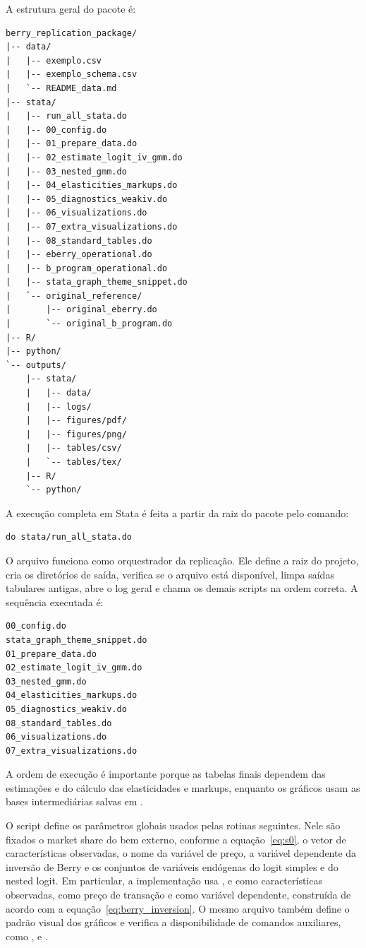 \documentclass[12pt,a4paper]{article}
\begin{document}
A estrutura geral do pacote é:

\begin{verbatim}
berry_replication_package/
|-- data/
|   |-- exemplo.csv
|   |-- exemplo_schema.csv
|   `-- README_data.md
|-- stata/
|   |-- run_all_stata.do
|   |-- 00_config.do
|   |-- 01_prepare_data.do
|   |-- 02_estimate_logit_iv_gmm.do
|   |-- 03_nested_gmm.do
|   |-- 04_elasticities_markups.do
|   |-- 05_diagnostics_weakiv.do
|   |-- 06_visualizations.do
|   |-- 07_extra_visualizations.do
|   |-- 08_standard_tables.do
|   |-- eberry_operational.do
|   |-- b_program_operational.do
|   |-- stata_graph_theme_snippet.do
|   `-- original_reference/
|       |-- original_eberry.do
|       `-- original_b_program.do
|-- R/
|-- python/
`-- outputs/
    |-- stata/
    |   |-- data/
    |   |-- logs/
    |   |-- figures/pdf/
    |   |-- figures/png/
    |   |-- tables/csv/
    |   `-- tables/tex/
    |-- R/
    `-- python/
\end{verbatim}

A execução completa em Stata é feita a partir da raiz do pacote pelo comando:

\begin{verbatim}
do stata/run_all_stata.do
\end{verbatim}

O arquivo  funciona como orquestrador da replicação. Ele define a raiz do projeto, cria os diretórios de saída, verifica se o arquivo  está disponível, limpa saídas tabulares antigas, abre o log geral e chama os demais scripts na ordem correta. A sequência executada é:

\begin{verbatim}
00_config.do
stata_graph_theme_snippet.do
01_prepare_data.do
02_estimate_logit_iv_gmm.do
03_nested_gmm.do
04_elasticities_markups.do
05_diagnostics_weakiv.do
08_standard_tables.do
06_visualizations.do
07_extra_visualizations.do
\end{verbatim}

A ordem de execução é importante porque as tabelas finais dependem das estimações e do cálculo das elasticidades e markups, enquanto os gráficos usam as bases intermediárias salvas em .

O script  define os parâmetros globais usados pelas rotinas seguintes. Nele são fixados o market share do bem externo, conforme a equação~\eqref{eq:s0}, o vetor de características observadas, o nome da variável de preço, a variável dependente da inversão de Berry e os conjuntos de variáveis endógenas do logit simples e do nested logit. Em particular, a implementação usa ,  e  como características observadas,  como preço de transação e  como variável dependente, construída de acordo com a equação~\eqref{eq:berry_inversion}. O mesmo arquivo também define o padrão visual dos gráficos e verifica a disponibilidade de comandos auxiliares, como ,  e .
\end{document}
